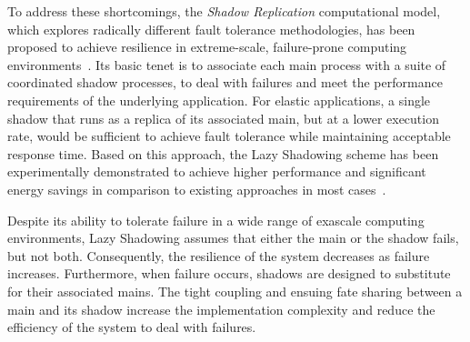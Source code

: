 To address these shortcomings, the {\it Shadow Replication} computational model, which explores radically different fault tolerance methodologies, has been proposed to achieve resilience in extreme-scale, failure-prone computing environments~\cite{mills2014power}. Its basic tenet is to associate each main process with a suite of coordinated shadow processes, %
to deal with failures and meet the performance requirements of the underlying application. 
For elastic applications, %
a single shadow that runs as a replica of its associated main, but at a lower execution rate, would be sufficient to achieve fault tolerance while maintaining acceptable response time. 
Based on this approach, the Lazy Shadowing scheme has been experimentally demonstrated to achieve higher performance and significant energy savings in comparison to existing approaches in most cases~\cite{cui_2016_scalcom}. 

Despite its ability to tolerate failure in a wide range of exascale computing environments, Lazy Shadowing assumes that either the main or the shadow fails, but not both. Consequently, the resilience of the system decreases as failure increases. Furthermore, when failure occurs, shadows are designed to substitute for their associated mains. The tight coupling and ensuing fate sharing between a main and its shadow increase the implementation complexity and reduce the efficiency of the system to deal with failures. 

